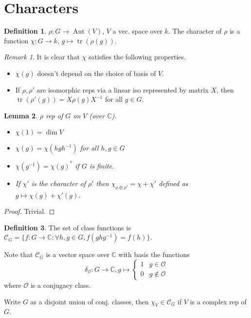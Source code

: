 \documentclass{article}
\theoremstyle{definition}
\newtheorem{defn}{Definition}[section]
\theoremstyle{remark}
\newtheorem{rem}{Remark}
\theoremstyle{plain}
\newtheorem{lem}[defn]{Lemma}
\newcommand{\CC}{\mathbb{C}}
\begin{document}
\section{Characters}
\begin{defn}
    $\rho:G\to\operatorname{Aut}(V)$, $V$ a vec. space over $k$. The character of $\rho$ is a function $\chi:G\to k$, $g\mapsto\operatorname{tr}(\rho(g))$.
\end{defn}
\begin{rem}
    It is clear that $\chi$ satisfies the following properties.
    \begin{itemize}
        \item $\chi(g)$ doesn't depend on the choice of basis of $V$.
        \item If $\rho,\rho'$ are isomorphic reps via a linear iso represented by matrix $X$, then $\operatorname{tr}(\rho'(g))=X\rho(g) X^{-1}$ for all $g\in G$.
    \end{itemize}
\end{rem}
\begin{lem}
    $\rho$ rep of $G$ on $V$ (over $\CC$).
    \begin{itemize}
        \item $\chi(1)=\dim V$
        \item $\chi(g)=\chi(hgh^{-1})$ for all $h,g\in G$
        \item $\chi(g^{-1})=\chi(g)^\ast$ if $G$ is finite.
        \item If $\chi'$ is the character of $\rho'$ then $\chi_{\rho\oplus\rho'}=\chi+\chi'$ defined as $g\mapsto\chi(g)+\chi'(g)$.
    \end{itemize}
\end{lem}
\begin{proof}
    Trivial.
\end{proof}
\begin{defn}
    The set of class functions is $\mathcal{C}_G=\{f:G\to\CC:\forall h,g\in G, f(ghg^{-1})=f(h)\}$.
\end{defn}
Note that $\mathcal{C}_G$ is a vector space over $\CC$ with basis the functions \[\delta_{\mathcal{O}}:G\to\CC,g\mapsto \begin{cases}1&g\in\mathcal{O}\\ 0&g\not\in\mathcal{O}\end{cases}\]
where $\mathcal{O}$ is a conjugacy class.

Write $G$ as a disjoint union of conj. classes, then $\chi_V\in\mathcal{C}_G$ if $V$ is a complex rep of $G$.
\end{document}
